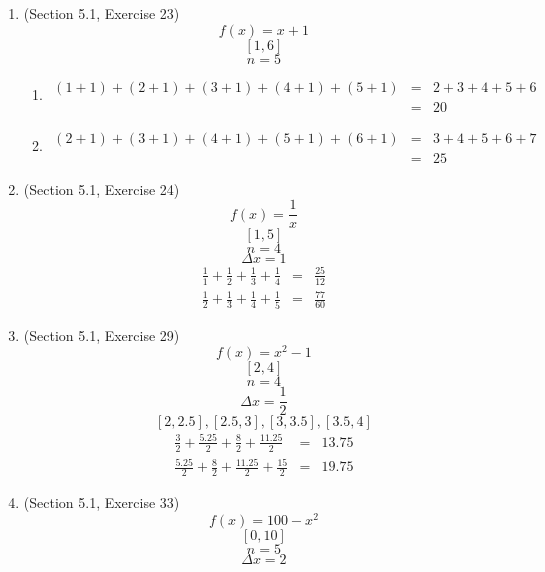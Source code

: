 \documentclass{article}
\begin{document}
\begin{enumerate}
\begin{enumerate}
        \end{enumerate}
    \item (Section 5.1, Exercise 23)
        $$f(x) = x + 1$$
        $$[1,6]$$
        $$n = 5$$
        \begin{enumerate}
            \item
            \begin{eqnarray}
                \left(1 + 1\right) + \left(2 + 1\right) + \left(3 + 1\right) + \left(4 + 1\right) + \left(5 + 1\right) &=& 2 + 3 + 4 + 5 + 6 \\
                                                                                                                       &=& 20
            \end{eqnarray}
            \item
            \begin{eqnarray}
                \left(2 + 1\right) + \left(3 + 1\right) + \left(4 + 1\right) + \left(5 + 1\right) + \left(6 + 1\right) &=& 3 + 4 + 5 + 6 + 7 \\
                                                                                                                       &=& 25
            \end{eqnarray}
        \end{enumerate}
    \item (Section 5.1, Exercise 24)
        $$f(x) = \frac{1}{x}$$
        $$[1,5]$$
        $$n = 4$$
        $$\Delta{x} = 1$$
        \begin{eqnarray}
            \frac{1}{1} + \frac{1}{2} + \frac{1}{3} + \frac{1}{4} &=& \frac{25}{12} \\
            \frac{1}{2} + \frac{1}{3} + \frac{1}{4} + \frac{1}{5} &=& \frac{77}{60}
        \end{eqnarray}
    \item (Section 5.1, Exercise 29)
        $$f(x) = x^2 - 1$$
        $$[2,4]$$
        $$n = 4$$
        $$\Delta{x} = \frac{1}{2}$$
        $$[2,2.5],[2.5,3],[3,3.5],[3.5,4]$$
        \begin{eqnarray}
            \frac{3}{2} + \frac{5.25}{2} + \frac{8}{2} + \frac{11.25}{2} &=& 13.75 \\
            \frac{5.25}{2} + \frac{8}{2} + \frac{11.25}{2} + \frac{15}{2} &=& 19.75
        \end{eqnarray}
    \item (Section 5.1, Exercise 33)
        $$f(x) = 100 - x^2$$
        $$[0,10]$$
        $$n = 5$$
        $$\Delta{x} = 2$$
        \begin{eqnarray}

\end{eqnarray}
\end{enumerate}
\end{document}
